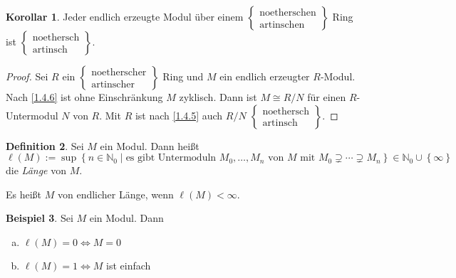 \documentclass[
twoside=semi,
fontsize=12,
DIV=12, 
cleardoublepage=current,
leqno,
headings=optiontoheadandtoc, 
toc=idx
]{scrbook}
\newcommand{\N}{\mathbb{N}}
\newcommand{\set}[1]{\left\{ #1 \right\}}
\newcommand{\textcase}[2]{$\begin{Bmatrix} \textrm{#1} \\ \textrm{#2}\end{Bmatrix}$}
\theoremstyle{definition}
\newtheorem{definition}{Definition}[section]
\newtheorem{beispiel}[definition]{Beispiel}
\newtheorem{korollar}[definition]{Korollar}
\begin{document}
	\begin{korollar}\label{1.4.7}\hfill\newline
		Jeder endlich erzeugte Modul \"uber einem \textcase{noetherschen}{artinschen} Ring ist \textcase{noethersch}{artinsch}.
		
		\begin{proof}
			Sei $R$ ein \textcase{noetherscher}{artinscher} Ring und $M$ ein endlich erzeugter $R$-Modul. Nach \ref{1.4.6} ist ohne Einschr\"ankung $M$ zyklisch. Dann ist $M \cong R/N$ f\"ur einen $R$-Untermodul $N$ von $R$. Mit $R$ ist nach \ref{1.4.5} auch $R/N$ \textcase{noethersch}{artinsch}.
		\end{proof}
	\end{korollar}

	\begin{definition}\label{1.4.8}\hfill\newline
		Sei $M$ ein Modul. Dann heißt 
			\[\ell(M) := \sup \set{n \in \N_0 \mid \textrm{es gibt Untermoduln } M_0, \dots, M_n \textrm{ von } M \textrm{ mit } M_0 \supsetneq \cdots \supsetneq M_n} \in \N_0 \cup \set{\infty}\]
		die \emph{L\"ange} von $M$.
	
		\noindent Es heißt $M$ von endlicher L\"ange, wenn $\ell(M) < \infty$.
	\end{definition}

	\begin{beispiel}\label{1.4.9}\hfill\newline
		Sei $M$ ein Modul. Dann 
		\begin{enumerate}[(a)]
			\item $\ell(M) = 0 \Leftrightarrow M = 0$
			\item $\ell(M) = 1 \Leftrightarrow M$ ist einfach
		\end{enumerate}
	\end{beispiel}
\end{document}
